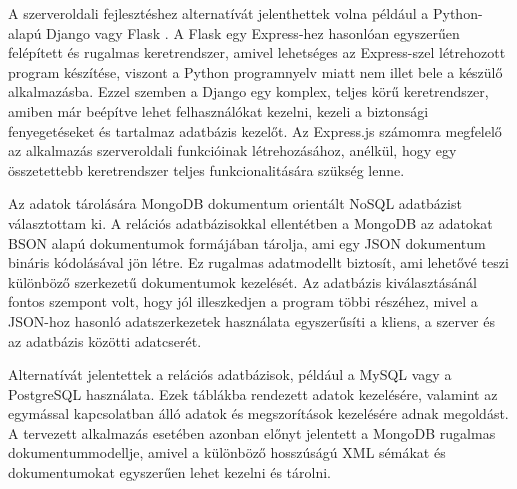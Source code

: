 A szerveroldali fejlesztéshez alternatívát jelenthettek volna például a Python-alapú Django \cite{django} vagy Flask \cite{flask}. A Flask egy Express-hez hasonlóan egyszerűen felépített és rugalmas keretrendszer, amivel lehetséges az Express-szel létrehozott program készítése, viszont a Python programnyelv miatt nem illet bele a készülő alkalmazásba. Ezzel szemben a Django egy komplex, teljes körű keretrendszer, amiben már beépítve lehet felhasználókat kezelni, kezeli a biztonsági fenyegetéseket és tartalmaz adatbázis kezelőt. Az Express.js számomra megfelelő az alkalmazás szerveroldali funkcióinak létrehozásához, anélkül, hogy egy összetettebb keretrendszer teljes funkcionalitására szükség lenne.


Az adatok tárolására MongoDB dokumentum orientált NoSQL adatbázist választottam ki. A relációs adatbázisokkal ellentétben a MongoDB az adatokat BSON alapú dokumentumok formájában tárolja, ami egy JSON dokumentum bináris kódolásával jön létre. Ez rugalmas adatmodellt biztosít, ami lehetővé teszi különböző szerkezetű dokumentumok kezelését. Az adatbázis kiválasztásánál fontos szempont volt, hogy jól illeszkedjen a program többi részéhez, mivel a JSON-hoz hasonló adatszerkezetek használata egyszerűsíti a kliens, a szerver és az adatbázis közötti adatcserét.

Alternatívát jelentettek a relációs adatbázisok, például a MySQL \cite{mysql} vagy a PostgreSQL \cite{postgresql} használata. Ezek táblákba rendezett adatok kezelésére, valamint az egymással kapcsolatban álló adatok és megszorítások kezelésére adnak megoldást. A tervezett alkalmazás esetében azonban előnyt jelentett a MongoDB rugalmas dokumentummodellje, amivel a különböző hosszúságú XML sémákat és dokumentumokat egyszerűen lehet kezelni és tárolni.